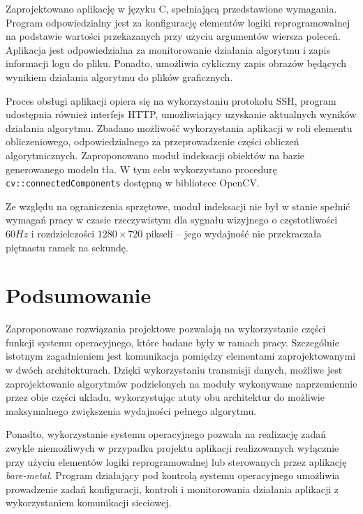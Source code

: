 Zaprojektowano aplikację w języku C, spełniającą przedstawione wymagania.
Program odpowiedzialny jest za konfigurację elementów logiki reprogramowalnej na podstawie wartości przekazanych przy użyciu argumentów wiersza poleceń. 
Aplikacja jest odpowiedzialna za monitorowanie działania algorytmu i zapis informacji logu do pliku. %
Ponadto, umożliwia cykliczny zapis obrazów będących wynikiem działania algorytmu do plików graficznych. 

Proces obsługi aplikacji opiera się na wykorzystaniu protokołu SSH, program udostępnia również interfejs HTTP, umożliwiający uzyskanie aktualnych wyników działania algorytmu.
Zbadano możliwość wykorzystania aplikacji w roli elementu obliczeniowego, odpowiedzialnego za przeprowadzenie części obliczeń algorytmicznych. %
Zaproponowano moduł indeksacji obiektów na bazie generowanego modelu tła. 
W tym celu wykorzystano procedurę \texttt{cv::connectedComponents} dostępną w bibliotece OpenCV. %

Ze względu na ograniczenia sprzętowe, moduł indeksacji nie był w stanie spełnić wymagań pracy w czasie rzeczywistym dla sygnału wizyjnego o częstotliwości $60Hz$ i rozdzielczości $1280 \times 720 $ pikseli -- jego wydajność nie przekraczała piętnastu ramek na sekundę.

\section*{Podsumowanie}

Zaproponowane rozwiązania projektowe pozwalają na wykorzystanie części funkcji systemu operacyjnego, które badane były w ramach pracy. 
Szczególnie istotnym zagadnieniem jest komunikacja pomiędzy elementami zaprojektowanymi w dwóch architekturach. 
Dzięki wykorzystaniu transmisji danych, możliwe jest zaprojektowanie algorytmów podzielonych na moduły wykonywane naprzemiennie przez obie części układu, wykorzystując atuty obu architektur do możliwie maksymalnego zwiększenia wydajności pełnego algorytmu.

Ponadto, wykorzystanie systemu operacyjnego pozwala na realizację zadań zwykle niemożliwych w przypadku projektu aplikacji realizowanych wyłącznie przy użyciu elementów logiki reprogramowalnej lub sterowanych przez aplikację \textit{bare-metal}. 
Program działający pod kontrolą systemu operacyjnego umożliwia prowadzenie zadań konfiguracji, kontroli i monitorowania działania aplikacji z wykorzystaniem komunikacji sieciowej.

